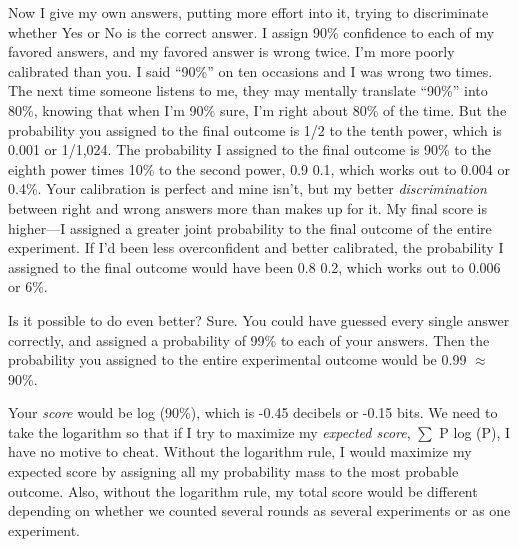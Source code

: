 {
 Now I give my own answers, putting more effort into it, trying to
discriminate whether Yes or No is the correct answer. I assign 90\%
confidence to each of my favored answers, and my favored answer is
wrong twice. I'm more poorly calibrated than you. I
said ``90\%'' on ten occasions and I
was wrong two times. The next time someone listens to me, they may
mentally translate ``90\%'' into
80\%, knowing that when I'm 90\% sure,
I'm right about 80\% of the time. But the probability
you assigned to the final outcome is 1/2 to the tenth power, which is
0.001 or 1/1,024. The probability I assigned to the final outcome is
90\% to the eighth power times 10\% to the second power,
0.9 {\texttimes} 0.1, which works
out to 0.004 or 0.4\%. Your calibration is perfect and mine
isn't, but my better \textit{discrimination} between
right and wrong answers more than makes up for it. My final score is
higher---I assigned a greater joint probability to the final outcome of
the entire experiment. If I'd been less overconfident
and better calibrated, the probability I assigned to the final outcome
would have been 0.8 {\texttimes}
0.2, which works out to 0.006 or 6\%.}

{
 Is it possible to do even better? Sure. You could have guessed
every single answer correctly, and assigned a probability of 99\% to
each of your answers. Then the probability you assigned to the entire
experimental outcome would be 0.99 ${\approx}$
90\%.}

{
 Your \textit{score} would be log (90\%), which is -0.45 decibels
or -0.15 bits. We need to take the logarithm so that if I try to
maximize my \textit{expected score}, ${\sum}$ P {\texttimes} log (P), I
have no motive to cheat. Without the logarithm rule, I would maximize
my expected score by assigning all my probability mass to the most
probable outcome. Also, without the logarithm rule, my total score
would be different depending on whether we counted several rounds as
several experiments or as one experiment.}

